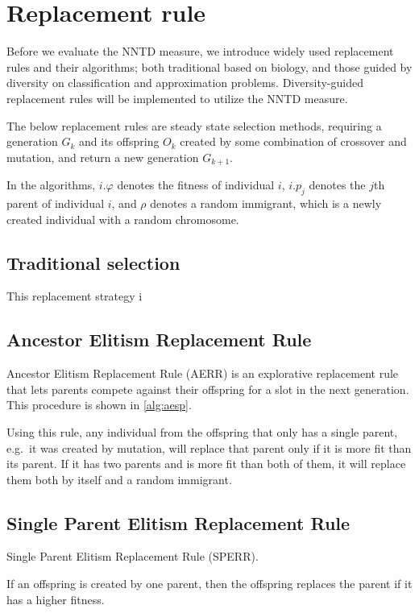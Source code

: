 \section{Replacement rule}\label{sec:replacementrules}
Before we evaluate the NNTD measure, we introduce widely used replacement rules and their algorithms; both traditional based on biology, and those guided by diversity on classification and approximation problems. Diversity-guided replacement rules will be implemented to utilize the NNTD measure.

The below replacement rules are steady state selection methods, requiring a generation $G_k$ and its offspring $O_k$ created by some combination of crossover and mutation, and return a new generation $G_{k+1}$.

In the algorithms, $i.\varphi$ denotes the fitness of individual $i$, $i.p_j$ denotes the $j$th parent of individual $i$, and $\rho$ denotes a random immigrant, which is a newly created individual with a random chromosome.

\subsection{Traditional selection}
This replacement strategy i

\subsection{Ancestor Elitism Replacement Rule}
Ancestor Elitism Replacement Rule (AERR) is an explorative replacement rule that lets parents compete against their offspring for a slot in the next generation. This procedure is shown in \cref{alg:aesp}.
%

%
Using this rule, any individual from the offspring that only has a single parent, e.g.\ it was created by mutation, will replace that parent only if it is more fit than its parent. If it has two parents and is more fit than both of them, it will replace them both by itself and a random immigrant.

\subsection{Single Parent Elitism Replacement Rule}
Single Parent Elitism Replacement Rule (SPERR). 

If an offspring is created by one parent, then the offspring replaces the parent if it has a higher fitness. 

